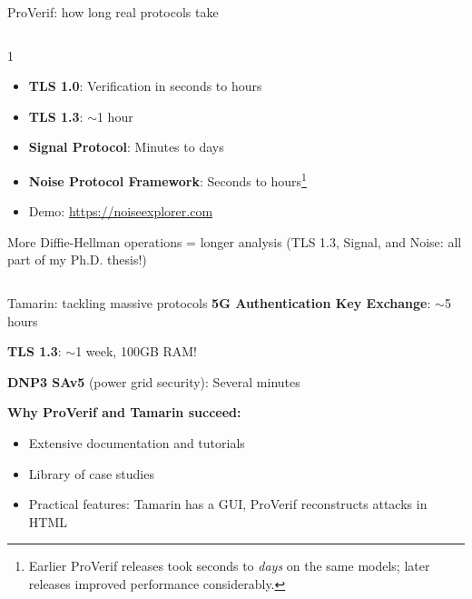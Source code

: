 \ifdefined\PRESENTATION\else\PassOptionsToClass{handout}{beamer}\fi\documentclass[aspectratio=169, lualatex]{beamer}
\begin{document}
\begin{frame}{ProVerif: how long real protocols take}
	\begin{columns}[c]
		\begin{column}{1\textwidth}
			\begin{itemize}
				\item \textbf{TLS 1.0}: Verification in seconds to hours
				\item \textbf{TLS 1.3}: $\sim$1 hour
				\item \textbf{Signal Protocol}: Minutes to days
				\item \textbf{Noise Protocol Framework}: Seconds to hours\footnote{Earlier ProVerif releases took seconds to \textit{days} on the same models; later releases improved performance considerably.}
			\end{itemize}

			\begin{itemize}
				\item Demo: \url{https://noiseexplorer.com}
			\end{itemize}
			\vspace{0.5em}
			\begin{center}
				\Large
				More Diffie-Hellman operations = longer analysis
				\vspace{0.3em}
				\normalsize
				(TLS 1.3, Signal, and Noise: all part of my Ph.D. thesis!)
			\end{center}
		\end{column}
	\end{columns}
\end{frame}

\begin{frame}{Tamarin: tackling massive protocols}
	\textbf{5G Authentication Key Exchange}: $\sim$5 hours
	\vspace{0.3em}

	\textbf{TLS 1.3}: $\sim$1 week, 100GB RAM!
	\vspace{0.3em}

	\textbf{DNP3 SAv5} (power grid security): Several minutes
	\vspace{1em}

	\textbf{Why ProVerif and Tamarin succeed:}
	\begin{itemize}
		\item Extensive documentation and tutorials
		\item Library of case studies
		\item Practical features: Tamarin has a GUI, ProVerif reconstructs attacks in HTML
	\end{itemize}
\end{frame}
\end{document}
